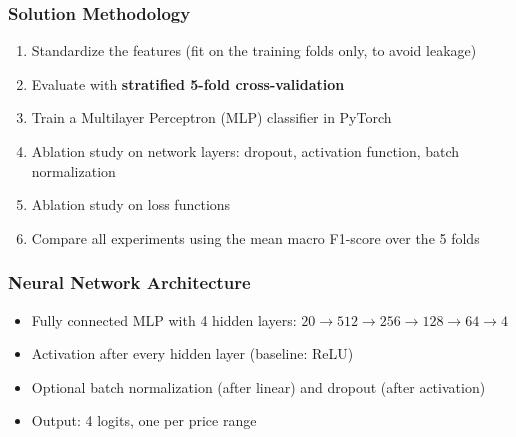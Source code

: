 \documentclass{beamer}
\begin{document}
\begin{frame}
    \frametitle{Solution Methodology}
    \begin{enumerate}
        \item Standardize the features (fit on the training folds only, to avoid leakage)
        \item Evaluate with \textbf{stratified 5-fold cross-validation}
        \item Train a Multilayer Perceptron (MLP) classifier in PyTorch
        \item Ablation study on network layers: dropout, activation function, batch normalization
        \item Ablation study on loss functions
        \item Compare all experiments using the mean macro F1-score over the 5 folds
    \end{enumerate}
\end{frame}

\begin{frame}
    \frametitle{Neural Network Architecture}
    \begin{center}
    \end{center}
    \begin{itemize}
        \item Fully connected MLP with 4 hidden layers: $20 \rightarrow 512 \rightarrow 256 \rightarrow 128 \rightarrow 64 \rightarrow 4$
        \item Activation after every hidden layer (baseline: ReLU)
        \item Optional batch normalization (after linear) and dropout (after activation)
        \item Output: 4 logits, one per price range
    \end{itemize}
\end{frame}
\end{document}
